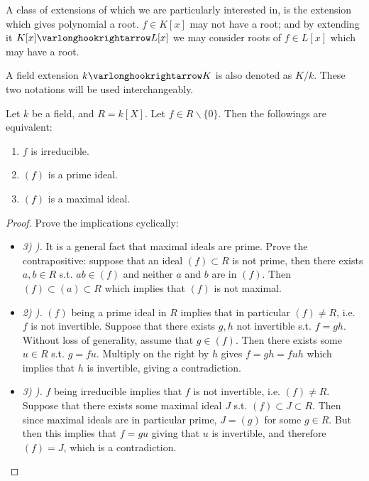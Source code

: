 \textstart
A class of extensions of which we are particularly interested in, is the extension which gives polynomial a root. $f \in K[x]$ may not have a root; and by extending it $K[x] \ext L[x]$ we may consider roots of $f \in L[x]$ which may have a root.

\begin{notation}
    A field extension $k \ext K$ is also denoted as $K/k$. These two notations will be used interchangeably.
\end{notation}

\begin{proposition}
    Let $k$ be a field, and $R = k[X]$. Let $f \in R \smallsetminus \{0\}$. Then the followings are equivalent:
    \begin{enumerate}[label=\arabic*)]
        \item $f$ is irreducible.
        \item $(f)$ is a prime ideal.
        \item $(f)$ is a maximal ideal.
    \end{enumerate}
\end{proposition}

\begin{proof}
    Prove the implications cyclically:
    \begin{itemize}
        \item \emph{3) ).} It is a general fact that maximal ideals are prime. Prove the contrapositive: suppose that an ideal $(f) \subset R$ is not prime, then there exists $a, b \in R$ s.t. $ab \in (f)$ and neither $a$ and $b$ are in $(f)$. Then $(f) \subset (a) \subset R$ which implies that $(f)$ is not maximal.
        \item \emph{2) ).} $(f)$ being a prime ideal in $R$ implies that in particular $(f) \neq R$, i.e. $f$ is not invertible. Suppose that there exists $g, h$ not invertible s.t. $f = gh$. Without loss of generality, assume that $g \in (f)$. Then there exists some $u \in R$ s.t. $g = fu$. Multiply on the right by $h$ gives $f = gh = fuh$ which implies that $h$ is invertible, giving a contradiction.
        \item \emph{3) ).} $f$ being irreducible implies that $f$ is not invertible, i.e. $(f) \neq R$. Suppose that there exists some maximal ideal $J$ s.t. $(f) \subset J \subset R$. Then since maximal ideals are in particular prime, $J = (g)$ for some $g \in R$. But then this implies that $f = gu$ giving that $u$ is invertible, and therefore $(f) = J$, which is a contradiction.
    \end{itemize}
\end{proof}

